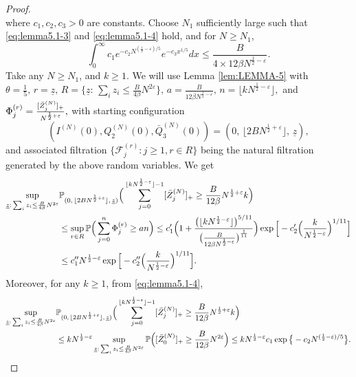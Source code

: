 \documentclass[11pt, reqno]{article}
\numberwithin{equation}{section}
\numberwithin{theorem}{section}
\begin{document}
\begin{appendix}
\begin{proof}
\begin{equation}
\end{equation}
where $c_1,c_2,c_3>0$ are constants.
Choose $N_1$ sufficiently large such that \eqref{eq:lemma5.1-3} and \eqref{eq:lemma5.1-4} hold, and for $N\geq N_1$,
$$\int_0^{\infty}c_1e^{-c_2N^{(\frac{1}{2}-\varepsilon)/5}}e^{-c_3x^{1/5}}dx\leq \frac{B}{4\times 12\beta N^{\frac{1}{2}-\varepsilon}}.$$
Take any $N\geq N_1$, and $k\geq 1$. 
We will use Lemma \ref{lem:LEMMA-5}  with
$\theta =\frac{1}{5}, \, r=\underline{z}, \, R = \{\underline{z}: \, \sum_iz_i \leq \frac{B}{4\beta}N^{2\varepsilon}\}, \, a=\frac{B}{12\beta N^{\frac{1}{2}-\varepsilon}}, \, n= \lfloor kN^{\frac{1}{2}-\varepsilon}\rfloor,$
and 
$\Phi^{(r)}_j=\frac{[\Bar{Z}^{(N)}_j]_+}{N^{\frac{1}{2}+\varepsilon}},$
with starting configuration $$(I^{(N)}(0), Q_2^{(N)}(0), \bar{Q}^{(N)}_3(0)) = (0, \, \lfloor 2BN^{\frac{1}{2}+\varepsilon} \rfloor, \,\underline{z}),$$ and associated filtration $\big\{\mathcal{F}^{(r)}_j : j\geq 1, r \in R\big\}$ being the natural filtration generated by the above random variables.
We get
\begin{align}\label{eq:lemma5.1-5}
   \sup_{\underline{z}: \, \sum_iz_i \leq \frac{B}{4\beta}N^{2\varepsilon}}&\mathbb{P}_{(0, \, \lfloor 2BN^{\frac{1}{2}+\varepsilon} \rfloor, \,\underline{z})}\Big(\sum_{j=0}^{\lfloor kN^{\frac{1}{2}-\varepsilon}\rfloor-1}[\Bar{Z}^{(N)}_j]_+\geq \frac{B}{12\beta}N^{\frac{1}{2}+\varepsilon}k\Big)\nonumber\\
    &\le \sup_{r\in R}\mathbb{P}\Big(\sum_{j=0}^{n}\Phi^{(r)}_j\geq an\Big)
    \leq  c'_1\Big(1+\frac{\big(\lfloor kN^{\frac{1}{2}-\varepsilon}\rfloor\big)^{5/11}}{\big(\frac{B}{12\beta N^{\frac{1}{2}-\varepsilon}}\big)^{\frac{1}{11}}}\Big)\exp \Big[-c'_2\Big(\frac{k}{N^{\frac{1}{2}-\varepsilon}}\Big)^{1/11}\Big]\\\nonumber
    &\leq  c_1''N^{\frac{1}{2}-\varepsilon}\exp\Big[-c''_2\Big(\frac{k}{N^{\frac{1}{2}-\varepsilon}}\Big)^{1/11}\Big].\nonumber
\end{align}
Moreover,  for any $k\geq 1$, from \eqref{eq:lemma5.1-4},
\begin{align}\label{eq:sum-z}
     \sup_{\underline{z}: \, \sum_iz_i \leq \frac{B}{4\beta}N^{2\varepsilon}}&\mathbb{P}_{(0, \, \lfloor 2BN^{\frac{1}{2}+\varepsilon} \rfloor, \,\underline{z})}\Big(\sum_{j=0}^{\lfloor kN^{\frac{1}{2}-\varepsilon}\rfloor-1}[\Bar{Z}^{(N)}_j]_+\geq \frac{B}{12\beta}N^{\frac{1}{2}+\varepsilon}k\Big)\nonumber\\
     &\leq kN^{\frac{1}{2}-\varepsilon} \sup_{\underline{z}: \, \sum_iz_i \leq \frac{B}{4\beta}N^{2\varepsilon}}\mathbb{P}\Big([\Bar{Z}^{(N)}_0]_+\geq \frac{B}{12\beta}N^{2\varepsilon}\Big)\leq  kN^{\frac{1}{2}-\varepsilon}c_1\exp \big\{-c_2N^{(\frac{1}{2}-\varepsilon)/5}\big\}.

\end{align}
\end{proof}
\end{appendix}
\end{document}
